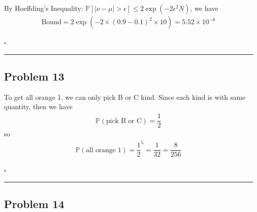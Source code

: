 \documentclass[12pt]{article}
\newcommand*{\QEDB}{\hfill\ensuremath{\square}}
\newcommand{\SBrackets}[1]{\left[#1\right]}
\newcommand{\ParTh}[1]{\left(#1\right)}
\newcommand{\AbsVal}[1]{\left|#1\right|}
\newcommand{\SciNum}[2]{#1\times{10}^{#2}}
\newcommand{\horrule}[1]{\rule{\linewidth}{#1}}
\begin{document}
By Hoeffding's Inequality: $\mathbb{P}\SBrackets{\AbsVal{\nu-\mu}>\epsilon}\leq2\exp\ParTh{-2\epsilon^2N}$, we have
\begin{align}
\text{Bound}=2\exp\ParTh{-2\times\ParTh{0.9-0.1}^2\times10}=\SciNum{5.52}{-6}
\end{align}

\QEDB

\horrule{0.5pt}

\subsection*{Problem 13}

To get all orange 1, we can only pick B or C kind. Since each kind is with same quantity, then we have
\begin{align}
\mathbb{P}\ParTh{\text{pick B or C}}=\dfrac{1}{2}
\end{align}
so
\begin{align}
\mathbb{P}\ParTh{\text{all orange 1}}=\dfrac{1}{2}^5=\dfrac{1}{32}=\dfrac{8}{256}
\end{align}

\QEDB

\horrule{0.5pt}

\subsection*{Problem 14}
\end{document}
